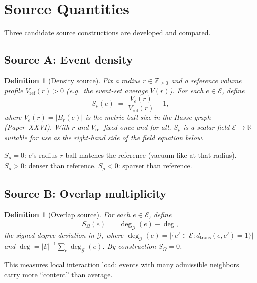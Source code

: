 \documentclass[12pt]{article}
\newtheorem{definition}[theorem]{Definition}
\newcommand{\Ecal}{\mathcal{E}}
\newcommand{\Gcal}{\mathcal{G}}
\begin{document}
\section{Source Quantities}\label{sec:source}

Three candidate source constructions are developed and compared.

\subsection{Source A: Event density}

\begin{definition}[Density source]\label{def:rho}
Fix a radius $r \in \mathbb{Z}_{\geq 0}$ and a reference volume profile $V_{\mathrm{ref}}(r) > 0$ (e.g.\ the event-set average $\bar V(r)$). For each $e \in \Ecal$, define
\begin{equation}\label{eq:rho}
    S_\rho(e) \;=\; \frac{V_e(r)}{V_{\mathrm{ref}}(r)} - 1,
\end{equation}
where $V_e(r) = |B_r(e)|$ is the metric-ball size in the Hasse graph (Paper~XXVI). With $r$ and $V_{\mathrm{ref}}$ fixed once and for all, $S_\rho$ is a scalar field $\Ecal \to \mathbb{R}$ suitable for use as the right-hand side of the field equation below.
\end{definition}

$S_\rho = 0$: $e$'s radius-$r$ ball matches the reference (vacuum-like at that radius). $S_\rho > 0$: denser than reference. $S_\rho < 0$: sparser than reference.

\subsection{Source B: Overlap multiplicity}

\begin{definition}[Overlap source]\label{def:overlap_source}
For each $e \in \Ecal$, define
\begin{equation}
    S_\Omega(e) \;=\; \deg_\Gcal(e) - \overline{\deg},
\end{equation}
the signed degree deviation in $\Gcal$, where $\deg_\Gcal(e) = |\{e' \in \Ecal : d_{\mathrm{trans}}(e, e') = 1\}|$ and $\overline{\deg} = |\Ecal|^{-1} \sum_e \deg_\Gcal(e)$. By construction $\bar S_\Omega = 0$.
\end{definition}

This measures local interaction load: events with many admissible neighbors carry more ``content'' than average.
\end{document}
